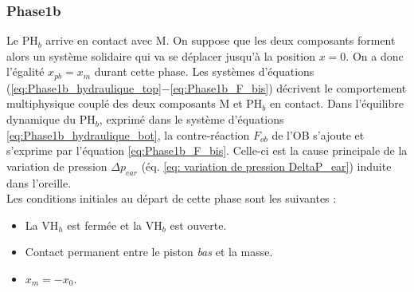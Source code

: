 \subsubsection*{Phase1b} %
Le PH$_b$ arrive en contact avec M. On suppose que les deux composants forment alors un système solidaire qui va se déplacer jusqu'à la position $x=0$. On a donc l'égalité $x_{pb} = x_m$ durant cette phase. Les systèmes d'équations (\ref{eq:Phase1b_hydraulique_top}$-$\ref{eq:Phase1b_F_bis}) décrivent le comportement multiphysique couplé des deux composants M et PH$_b$ en contact. Dans l'équilibre dynamique du PH$_b$, exprimé dans le système d'équations \ref{eq:Phase1b_hydraulique_bot}, la contre-réaction $F_{ob}$ de l'OB s'ajoute et s'exprime par l'équation \ref{eq:Phase1b_F_bis}. Celle-ci est la cause principale de la variation de pression $\Delta p_{ear}$ (éq. \ref{eq: variation de pression DeltaP_ear}) induite dans l'oreille.\\
Les conditions initiales au départ de cette phase sont les suivantes : 
\begin{itemize}[label=$\bullet$]
	\item La VH$_h$ est fermée et la VH$_b$ est ouverte.
 	\item Contact permanent entre le piston \emph{bas} et la masse.
	\item $x_m=-x_0$.
\end{itemize}
